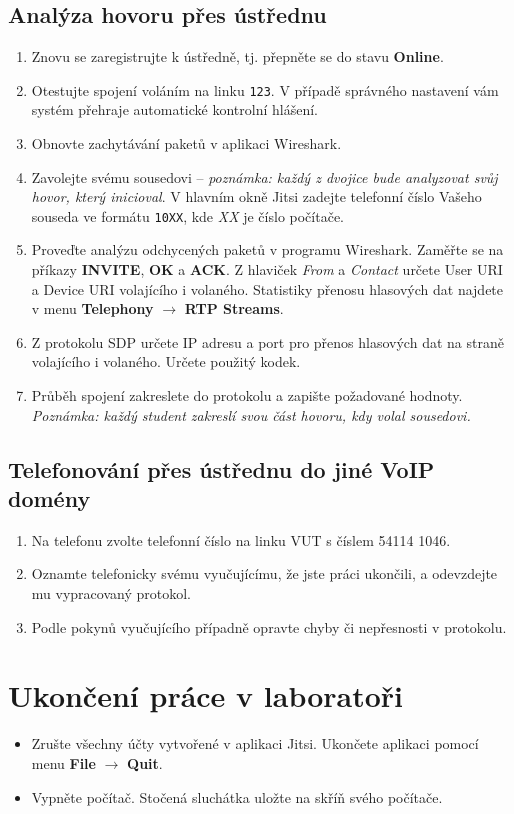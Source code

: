 \subsection{Analýza hovoru přes ústřednu}
\begin{enumerate}
  \item Znovu se zaregistrujte k ústředně, tj. přepněte se do stavu {\bf Online}.
  \item Otestujte spojení voláním na linku {\tt 123}. V případě správného nastavení vám systém přehraje automatické kontrolní hlášení. 
    \item Obnovte zachytávání paketů v aplikaci Wireshark.
    \item Zavolejte svému sousedovi -- {\it poznámka: každý z dvojice bude analyzovat svůj hovor, který inicioval}. V hlavním okně Jitsi zadejte telefonní číslo Vašeho souseda ve formátu {\tt 10XX}, kde {\it XX} je číslo počítače.
    \item Proveďte analýzu odchycených paketů v programu Wireshark. Zaměřte se na příkazy {\bf INVITE}, {\bf OK} a {\bf ACK}. Z hlaviček {\it From} a {\it Contact} určete User URI a Device URI volajícího i volaného. Statistiky přenosu hlasových dat najdete v menu {\bf Telephony} $\rightarrow$ {\bf RTP Streams}. 
    \item Z protokolu SDP určete IP adresu a port pro přenos hlasových dat na straně volajícího i volaného. Určete použitý kodek. 
    \item Průběh spojení zakreslete do protokolu a zapište požadované hodnoty. {\it Poznámka: každý student zakreslí svou část hovoru, kdy volal sousedovi.}
\end{enumerate}

\subsection{Telefonování přes ústřednu do jiné VoIP domény}
\begin{enumerate}
    \item Na telefonu zvolte telefonní číslo na linku VUT s číslem 54114 1046.
    \item Oznamte telefonicky svému vyučujícímu, že jste práci ukončili, a odevzdejte mu vypracovaný protokol. 
    \item Podle pokynů vyučujícího případně opravte chyby či nepřesnosti v protokolu. 
\end{enumerate}

\section{Ukončení práce v laboratoři}
\begin{itemize}
  \item Zrušte všechny účty vytvořené v aplikaci Jitsi. Ukončete aplikaci pomocí menu {\bf File} $\rightarrow$ {\bf Quit}.
  \item Vypněte počítač. Stočená sluchátka uložte na skříň svého počítače.
\end{itemize}
